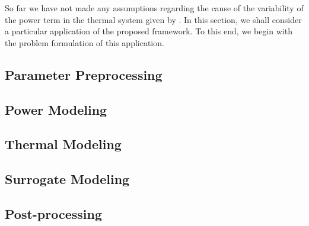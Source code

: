 So far we have not made any assumptions regarding the cause of the variability of the power term in the thermal system given by .
In this section, we shall consider a particular application of the proposed framework.
To this end, we begin with the problem formulation of this application.



\subsection{Parameter Preprocessing} 


\subsection{Power Modeling} 


\subsection{Thermal Modeling} 


\subsection{Surrogate Modeling} 


\subsection{Post-processing} 

